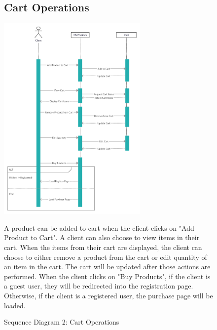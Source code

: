 \documentclass[11pt]{article}
\newcounter{use case ID}
\begin{document}
\begin{figure}[ht!]
    \subsection{Cart Operations}
    \centering
    \includegraphics[width=0.65\textwidth,height=0.45\paperheight]{Diagrams/Sequence/Cart_Operations.jpg}
    \caption{Sequence Diagram 2: Cart Operations}
    \label{fig: Cart Operations}
    \begin{justify}
        A product can be added to cart when the client clicks on "Add Product to Cart". A client can also choose to view items in their cart. When the items from their cart are displayed, the client can choose to either remove a product from the cart or edit quantity of an item in the cart. The cart will be updated after those actions are performed. When the client clicks on "Buy Products", if the client is a guest user, they will be redirected into the registration page. Otherwise, if the client is a registered user, the purchase page will be loaded.
    \end{justify}
\end{figure}
\end{document}
